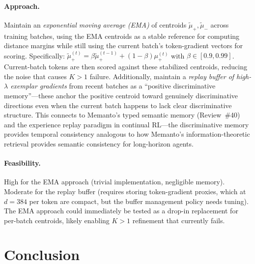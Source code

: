 \documentclass[11pt,a4paper]{article}
\begin{document}
\paragraph{Approach.}
Maintain an \emph{exponential moving average (EMA)} of centroids $\tilde{\mu}_+, \tilde{\mu}_-$ across training batches, using the EMA centroids as a stable reference for computing distance margins while still using the current batch's token-gradient vectors for scoring. Specifically: $\tilde{\mu}_+^{(t)} = \beta \tilde{\mu}_+^{(t-1)} + (1-\beta) \mu_+^{(t)}$ with $\beta \in [0.9, 0.99]$. Current-batch tokens are then scored against these stabilized centroids, reducing the noise that causes $K > 1$ failure. Additionally, maintain a \emph{replay buffer of high-$\lambda$ exemplar gradients} from recent batches as a ``positive discriminative memory''---these anchor the positive centroid toward genuinely discriminative directions even when the current batch happens to lack clear discriminative structure. This connects to Memanto's typed semantic memory (Review~\#40) and the experience replay paradigm in continual RL---the discriminative memory provides temporal consistency analogous to how Memanto's information-theoretic retrieval provides semantic consistency for long-horizon agents.

\paragraph{Feasibility.}
High for the EMA approach (trivial implementation, negligible memory). Moderate for the replay buffer (requires storing token-gradient proxies, which at $d = 384$ per token are compact, but the buffer management policy needs tuning). The EMA approach could immediately be tested as a drop-in replacement for per-batch centroids, likely enabling $K > 1$ refinement that currently fails.

\section*{Conclusion}
\end{document}
